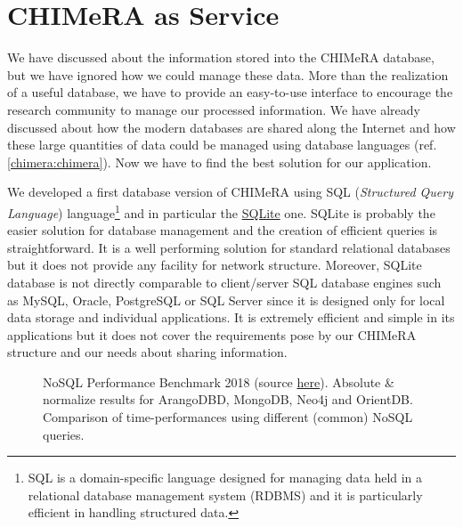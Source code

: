 \documentclass{standalone}
\begin{document}
\section[CHIMeRA as Service]{CHIMeRA as Service}\label{chimera:caas}

We have discussed about the information stored into the \textsf{CHIMeRA} database, but we have ignored how we could manage these data.
More than the realization of a useful database, we have to provide an easy-to-use interface to encourage the research community to manage our processed information.
We have already discussed about how the modern databases are shared along the Internet and how these large quantities of data could be managed using database languages (ref. \ref{chimera:chimera}).
Now we have to find the best solution for our application.

We developed a first database version of \textsf{CHIMeRA} using \textsf{SQL} (\emph{Structured Query Language}) language\footnote{
  \textsf{SQL} is a domain-specific language designed for managing data held in a relational database management system (RDBMS) and it is particularly efficient in handling structured data.

} and in particular the \href{https://www.sqlite.org/index.html}{\textsf{SQLite}} one.
\textsf{SQLite} is probably the easier solution for database management and the creation of efficient queries is straightforward.
It is a well performing solution for standard relational databases but it does not provide any facility for network structure.
Moreover, \textsf{SQLite} database is not directly comparable to client/server \textsf{SQL} database engines such as \textsf{MySQL}, \textsf{Oracle}, \textsf{PostgreSQL} or \textsf{SQL Server} since it is designed only for local data storage and individual applications.
It is extremely efficient and simple in its applications but it does not cover the requirements pose by our \textsf{CHIMeRA} structure and our needs about sharing information.

\begin{figure}[htbp]
\centering
\def\svgwidth{0.8\textwidth}

\caption{\textsf{NoSQL} Performance Benchmark 2018 (source \href{https://www.arangodb.com/2018/02/nosql-performance-benchmark-2018-mongodb-postgresql-orientdb-neo4j-arangodb/}{here}).
Absolute \& normalize results for ArangoDBD, MongoDB, Neo4j and OrientDB.
Comparison of time-performances using different (common) \textsf{NoSQL} queries.
}
\label{fig:arango}
\end{figure}
\end{document}
